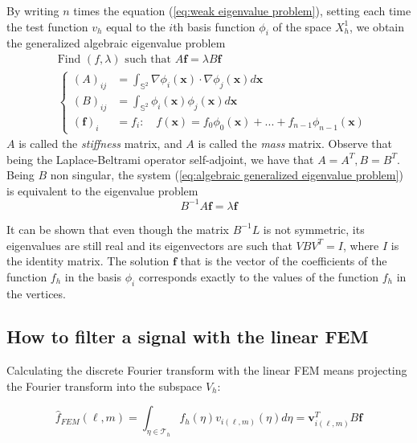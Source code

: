 By writing $n$ times the equation (\ref{eq:weak eigenvalue problem}), setting each time the test function $v_h$ equal to the $i$th basis function $\phi_i$ of the space $X_h^1$, we obtain the generalized algebraic eigenvalue problem
\begin{equation}\label{eq:algebraic generalized eigenvalue problem}
\begin{aligned}
&\text{Find }(f,\lambda)\text{ such that }A\mathbf f = \lambda B \mathbf f\\
&\begin{cases}
(A)_{ij} &= \int_{\mathbb S^2}\nabla \phi_i(\mathbf{x})\cdot \nabla \phi_j(\mathbf{x})d\mathbf{x}\\
(B)_{ij} &= \int_{\mathbb S^2} \phi_i(\mathbf{x}) \phi_j(\mathbf{x})d\mathbf{x}\\
(\mathbf f)_i &= f_i:\quad f(\mathbf x) = f_0\phi_0(\mathbf x)+ ... + f_{n-1}\phi_{n-1}(\mathbf x) 
\end{cases}
\end{aligned}
\end{equation}
$A$ is called the \textit{stiffness} matrix, and $A$ is called the \textit{mass} matrix. Observe that being the Laplace-Beltrami operator self-adjoint, we have that $A=A^T, B=B^T$. Being $B$ non singular, the system (\ref{eq:algebraic generalized eigenvalue problem}) is equivalent to the eigenvalue problem
\begin{equation}\label{eq:algebraic  eigenvalue problem}
B^{-1}A\mathbf f = \lambda \mathbf f
\end{equation}

It can be shown \cite{Strang} that even though the matrix $B^{-1}L$ is not symmetric, its eigenvalues are still real and its eigenvectors are such that $VBV^T=I$, where $I$ is the identity matrix. The solution $\mathbf f$ that is the vector of the coefficients of the function $f_h$ in the basis $\phi_i$ corresponds exactly to the values of the function $f_h$ in the vertices. 

\subsection{How to filter a signal with the linear FEM}
Calculating the discrete Fourier transform with the linear FEM means projecting the Fourier transform into the subspace $V_h$:

\begin{equation}\label{eq:FEM fourier}
	\hat f_{FEM} (\ell, m) = \int_{\eta \in \mathcal T_h} f_h(\eta) v_{i(\ell, m)}(\eta) d\eta = \mathbf v_{i(\ell, m)}^T B \mathbf f
\end{equation}

